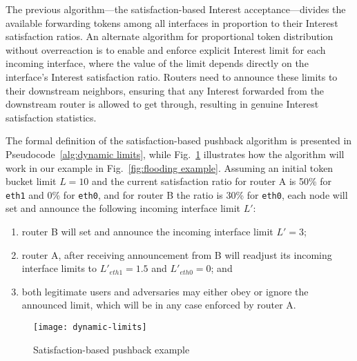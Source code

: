 The previous algorithm---the satisfaction-based Interest acceptance---divides the available forwarding tokens among all interfaces in proportion to their Interest satisfaction ratios.
An alternate algorithm for proportional token distribution without overreaction is to enable and enforce explicit Interest limit for each incoming interface, where the value of the limit depends directly on the interface's Interest satisfaction ratio.
Routers need to announce these limits to their downstream neighbors, ensuring that any Interest forwarded from the downstream router is allowed to get through, resulting in genuine Interest satisfaction statistics.

The formal definition of the satisfaction-based pushback algorithm is presented in Pseudocode~\ref{alg:dynamic limits}, while Fig.~\ref{fig:dynamic limits example} illustrates how the algorithm will work in our example in Fig.~\ref{fig:flooding example}.
Assuming an initial token bucket limit $L=10$ and the current satisfaction ratio for router A is 50\% for \texttt{eth1} and 0\% for \texttt{eth0}, and for router B the ratio is 30\% for \texttt{eth0}, each node will set and announce the following  incoming interface limit $L'$: 
\begin{enumerate}
\item router B will set and announce the incoming interface limit $L'=3$;
\item router A, after receiving announcement from B will readjust its incoming interface limits to $L'_{eth1} = 1.5$ and $L'_{eth0} = 0$; and
\item both legitimate users and adversaries may either obey or ignore the announced limit, which will be in any case enforced by router A.
\end{enumerate}


\begin{figure}[htbp]
  \centering
  \texttt{[image: dynamic-limits]}
  \caption{Satisfaction-based pushback example
}
  \label{fig:dynamic limits example}
\end{figure}



